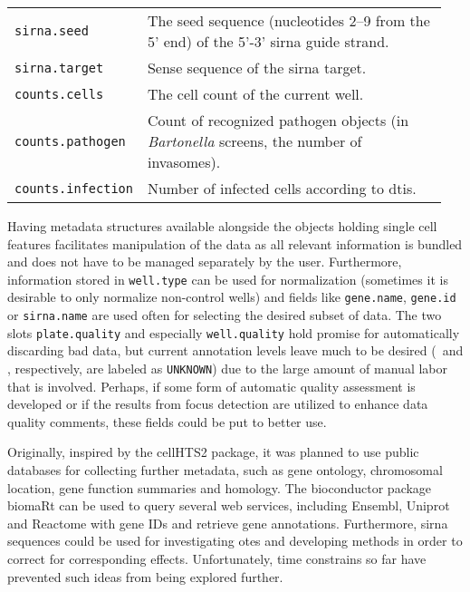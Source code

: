 \begin{table}
\begin{tabular}{L{0.25\linewidth}L{0.7\linewidth}}
    \texttt{sirna.seed} &
      The seed sequence (nucleotides 2--9 from the 5' end) of the 5'-3' \gls{sirna} guide strand. \\
    \texttt{sirna.target} &
      Sense sequence of the \gls{sirna} target. \\
    \texttt{counts.cells} &
      The cell count of the current well. \\
    \texttt{counts.pathogen} &
      Count of recognized pathogen objects (in \textit{Bartonella} screens, the number of invasomes). \\
    \texttt{counts.infection} &
      Number of infected cells according to \gls{dtis}. \\
    \hline 
  \end{tabular}
\end{table}

Having metadata structures available alongside the objects holding single cell features facilitates manipulation of the data as all relevant information is bundled and does not have to be managed separately by the user. Furthermore, information stored in \texttt{well.type} can be used for normalization (sometimes it is desirable to only normalize non-control wells) and fields like \texttt{gene.name}, \texttt{gene.id} or \texttt{sirna.name} are used often for selecting the desired subset of data. The two slots \texttt{plate.quality} and especially \texttt{well.quality} hold promise for automatically discarding bad data, but current annotation levels leave much to be desired (\knitrScfMetadatPlateQualityFrac\ and \knitrScfMetadatWellQualityFrac, respectively, are labeled as \texttt{UNKNOWN}) due to the large amount of manual labor that is involved. Perhaps, if some form of automatic quality assessment is developed or if the results from focus detection are utilized to enhance data quality comments, these fields could be put to better use.

Originally, inspired by the cellHTS2 package, it was planned to use public databases for collecting further metadata, such as gene ontology, chromosomal location, gene function summaries and homology. The bioconductor package biomaRt \citep{Durinck2005,Durinck2009} can be used to query several web services, including Ensembl, Uniprot and Reactome with gene IDs \citep{Maglott2011} and retrieve gene annotations. Furthermore, \gls{sirna} sequences could be used for investigating \glspl{ote} and developing methods in order to correct for corresponding effects. Unfortunately, time constrains so far have prevented such ideas from being explored further.

